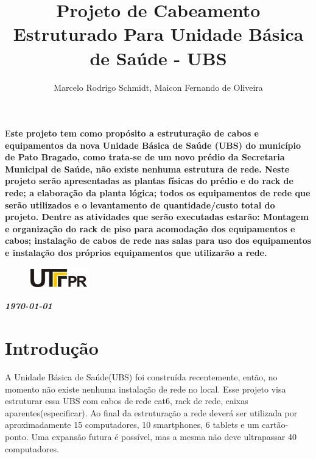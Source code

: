 \documentclass[	DIV=calc,%
							paper=a4,%
							fontsize=12pt,%
							onecolumn]{scrartcl}	 					%
\title{Projeto de Cabeamento Estruturado Para Unidade Básica de Saúde - UBS }					%
\author{Marcelo Rodrigo Schmidt, Maicon Fernando de Oliveira }  	%
\date{}																				%
\newcommand{\initial}[1]{%
     \lettrine[lines=3,lhang=0.3,nindent=0em]{
     				\color{DarkGoldenrod}
     				{\textsf{#1}}}{}}
\begin{document}
\maketitle
\thispagestyle{fancy} 	
\thispagestyle{empty}		%




\initial{E}\textbf{ste projeto tem como propósito a estruturação de cabos e equipamentos da nova Unidade Básica de Saúde (UBS) do município de Pato Bragado, como trata-se de um novo prédio da Secretaria Municipal de Saúde, não existe nenhuma estrutura de rede. Neste projeto serão apresentadas as plantas físicas do prédio e do rack de rede; a elaboração da planta lógica; todos os equipamentos de rede que serão utilizados e o levantamento de quantidade/custo total do projeto. Dentre as atividades que serão executadas estarão: Montagem e organização do rack de piso para acomodação dos equipamentos e cabos; instalação de cabos de rede nas salas para uso dos equipamentos e instalação dos próprios equipamentos que utilizarão a rede.}

\begin{figure}
	\centering
	\includegraphics{utfpr}
\end{figure}

\vspace{3cm}
\centerline{\textit{\textbf{\today}}}

\clearpage
    \renewcommand*\listfigurename{Lista de figuras}
\listoffigures

\renewcommand*\listtablename{Lista de tabelas}
\listoftables




\clearpage
\renewcommand{\contentsname}{Sumário}
\tableofcontents
\clearpage

\section{Introdução}
A Unidade Básica de Saúde(UBS) foi construída recentemente, então, no momento não existe nenhuma instalação de rede no local. 
Esse projeto visa estruturar essa UBS com cabos de rede cat6, rack de rede, caixas aparentes(especificar).
Ao final da estruturação a rede deverá ser utilizada por aproximadamente 15 computadores, 10 smartphones, 6 tablets e um cartão-ponto. Uma expansão futura é possível, mas a mesma não deve ultrapassar 40 computadores.
\end{document}
